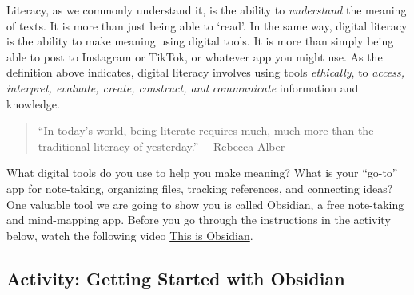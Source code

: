 \documentclass[
]{book}
\theoremstyle{definition}
\theoremstyle{definition}
\theoremstyle{definition}
\theoremstyle{definition}
\theoremstyle{remark}
\begin{document}
Literacy, as we commonly understand it, is the ability to \emph{understand} the meaning of texts. It is more than just being able to `read'. In the same way, digital literacy is the ability to make meaning using digital tools. It is more than simply being able to post to Instagram or TikTok, or whatever app you might use. As the definition above indicates, digital literacy involves using tools \emph{ethically}, to \emph{access, interpret, evaluate, create, construct, and communicate} information and knowledge.

\begin{quote}
``In today's world, being literate requires much, much more than the traditional literacy of yesterday.''
---Rebecca Alber
\end{quote}

What digital tools do you use to help you make meaning? What is your ``go-to'' app for note-taking, organizing files, tracking references, and connecting ideas? One valuable tool we are going to show you is called Obsidian, a free note-taking and mind-mapping app. Before you go through the instructions in the activity below, watch the following video \href{https://www.youtube.com/watch?v=d2FNqEDGc8g}{This is Obsidian}.

\hypertarget{activity-getting-started-with-obsidian}{%
\subsection*{Activity: Getting Started with Obsidian}\label{activity-getting-started-with-obsidian}}
\end{document}

